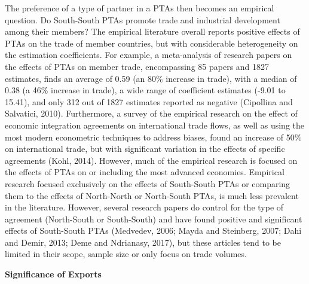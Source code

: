 The preference of a type of partner in a PTAs then becomes an empirical
question. Do South-South PTAs promote trade and industrial development
among their members? The empirical literature overall reports positive
effects of PTAs on the trade of member countries, but with considerable
heterogeneity on the estimation coefficients. For example, a
meta-analysis of research papers on the effects of PTAs on member trade,
encompassing 85 papers and 1827 estimates, finds an average of 0.59 (an
80\% increase in trade), with a median of 0.38 (a 46\% increase in
trade), a wide range of coefficient estimates (-9.01 to 15.41), and only
312 out of 1827 estimates reported as negative (Cipollina and Salvatici,
2010). Furthermore, a survey of the empirical research on the effect of
economic integration agreements on international trade flows, as well as
using the most modern econometric techniques to address biases, found an
increase of 50\% on international trade, but with significant variation
in the effects of specific agreements (Kohl, 2014). However, much of the
empirical research is focused on the effects of PTAs on or including the
most advanced economies. Empirical research focused exclusively on the
effects of South-South PTAs or comparing them to the effects of
North-North or North-South PTAs, is much less prevalent in the
literature. However, several research papers do control for the type of
agreement (North-South or South-South) and have found positive and
significant effects of South-South PTAs (Medvedev, 2006; Mayda and
Steinberg, 2007; Dahi and Demir, 2013; Deme and Ndrianasy, 2017), but
these articles tend to be limited in their scope, sample size or only
focus on trade volumes.

\textbf{Significance of Exports}